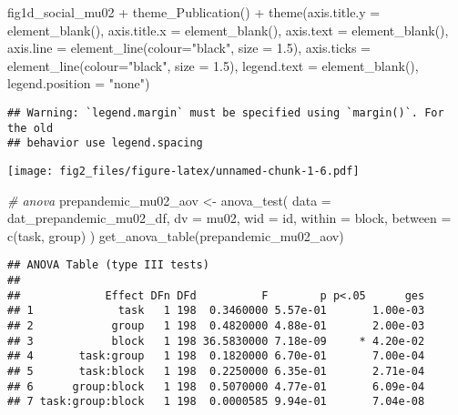 \documentclass[
]{article}
\newenvironment{Shaded}{\begin{snugshade}}{\end{snugshade}}
\newcommand{\AttributeTok}[1]{\textcolor[rgb]{0.77,0.63,0.00}{#1}}
\newcommand{\CommentTok}[1]{\textcolor[rgb]{0.56,0.35,0.01}{\textit{#1}}}
\newcommand{\FloatTok}[1]{\textcolor[rgb]{0.00,0.00,0.81}{#1}}
\newcommand{\FunctionTok}[1]{\textcolor[rgb]{0.00,0.00,0.00}{#1}}
\newcommand{\NormalTok}[1]{#1}
\newcommand{\OtherTok}[1]{\textcolor[rgb]{0.56,0.35,0.01}{#1}}
\newcommand{\SpecialCharTok}[1]{\textcolor[rgb]{0.00,0.00,0.00}{#1}}
\newcommand{\StringTok}[1]{\textcolor[rgb]{0.31,0.60,0.02}{#1}}
\begin{document}
\begin{Shaded}
\begin{Highlighting}[]
\NormalTok{fig1d\_social\_mu02 }\SpecialCharTok{+} \FunctionTok{theme\_Publication}\NormalTok{() }\SpecialCharTok{+} \FunctionTok{theme}\NormalTok{(}\AttributeTok{axis.title.y =} \FunctionTok{element\_blank}\NormalTok{(),}
                                                \AttributeTok{axis.title.x =} \FunctionTok{element\_blank}\NormalTok{(),}
                                                \AttributeTok{axis.text =} \FunctionTok{element\_blank}\NormalTok{(), }
                                                \AttributeTok{axis.line =} \FunctionTok{element\_line}\NormalTok{(}\AttributeTok{colour=}\StringTok{"black"}\NormalTok{, }\AttributeTok{size =} \FloatTok{1.5}\NormalTok{),}
                                                \AttributeTok{axis.ticks =} \FunctionTok{element\_line}\NormalTok{(}\AttributeTok{colour=}\StringTok{"black"}\NormalTok{, }\AttributeTok{size =} \FloatTok{1.5}\NormalTok{),}
                                                \AttributeTok{legend.text =} \FunctionTok{element\_blank}\NormalTok{(),}
                                                \AttributeTok{legend.position =} \StringTok{"none"}\NormalTok{)}
\end{Highlighting}
\end{Shaded}

\begin{verbatim}
## Warning: `legend.margin` must be specified using `margin()`. For the old
## behavior use legend.spacing
\end{verbatim}

\texttt{[image: fig2\_files/figure-latex/unnamed-chunk-1-6.pdf]}

\begin{Shaded}
\begin{Highlighting}[]
\CommentTok{\# anova}
\NormalTok{prepandemic\_mu02\_aov }\OtherTok{\textless{}{-}} \FunctionTok{anova\_test}\NormalTok{(}
  \AttributeTok{data =}\NormalTok{ dat\_prepandemic\_mu02\_df, }\AttributeTok{dv =}\NormalTok{ mu02, }\AttributeTok{wid =}\NormalTok{ id,}
  \AttributeTok{within =}\NormalTok{ block, }\AttributeTok{between =} \FunctionTok{c}\NormalTok{(task, group)}
\NormalTok{)}
\FunctionTok{get\_anova\_table}\NormalTok{(prepandemic\_mu02\_aov)}
\end{Highlighting}
\end{Shaded}

\begin{verbatim}
## ANOVA Table (type III tests)
## 
##             Effect DFn DFd          F        p p<.05      ges
## 1             task   1 198  0.3460000 5.57e-01       1.00e-03
## 2            group   1 198  0.4820000 4.88e-01       2.00e-03
## 3            block   1 198 36.5830000 7.18e-09     * 4.20e-02
## 4       task:group   1 198  0.1820000 6.70e-01       7.00e-04
## 5       task:block   1 198  0.2250000 6.35e-01       2.71e-04
## 6      group:block   1 198  0.5070000 4.77e-01       6.09e-04
## 7 task:group:block   1 198  0.0000585 9.94e-01       7.04e-08
\end{verbatim}
\end{document}
